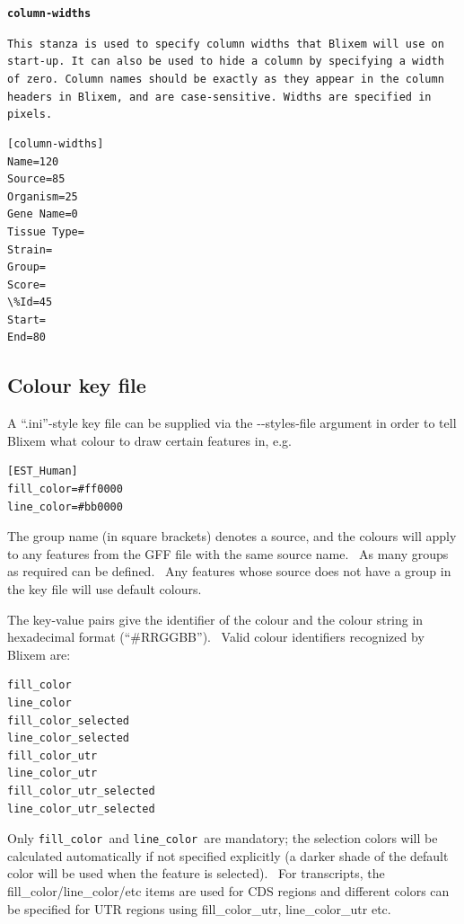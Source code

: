 \documentclass[letterpaper]{article}
\newcommand\textstyleSourceText[1]{\texttt{#1}}
\begin{document}
{\textstyleSourceText{\textrm{\textbf{column-widths }}}}

{\textstyleSourceText{\textrm{This stanza is used to specify column
widths that Blixem will use on start-up. It can also be used to hide a
column by specifying a width of zero. Column names should be exactly as
they appear in the column headers in Blixem, and are case-sensitive.
Widths are specified in pixels. }}}

\begin{verbatim}
[column-widths]
Name=120
Source=85
Organism=25
Gene Name=0
Tissue Type=
Strain=
Group=
Score=
\%Id=45
Start=
End=80
\end{verbatim}

{\color[rgb]{0.30980393,0.5058824,0.7411765}\subsection[Colour key file ]{Colour key file }}
\hypertarget{RefHeading30392057371307}{}{
A {\textquotedblleft}.ini{\textquotedblright}-style key file can be
supplied via the -{}-styles-file argument in order to tell Blixem what
colour to draw certain features in, e.g.}

\begin{verbatim}
[EST_Human]
fill_color=#ff0000
line_color=#bb0000
\end{verbatim}

{The group name (in square brackets) denotes a source, and the colours
will apply to any features from the GFF file with the same source name.
\ As many groups as required can be defined. \ Any features whose
source does not have a group in the key file will use default colours.}

\bigskip

{The key-value pairs give the identifier of the colour and the colour
string in hexadecimal format
({\textquotedblleft}\#RRGGBB{\textquotedblright}). \ Valid colour
identifiers recognized by Blixem are:}

\begin{verbatim}
fill_color
line_color
fill_color_selected
line_color_selected
fill_color_utr
line_color_utr
fill_color_utr_selected
line_color_utr_selected
\end{verbatim}

{Only \texttt{fill\_color }and \texttt{line\_color }are mandatory; the
selection colors will be calculated automatically if not specified
explicitly (a darker shade of the default color will be used when the
feature is selected). \ For transcripts, the
fill\_color/line\_color/etc items are used for CDS regions and
different colors can be specified for UTR regions using
fill\_color\_utr, line\_color\_utr etc.}
\end{document}
